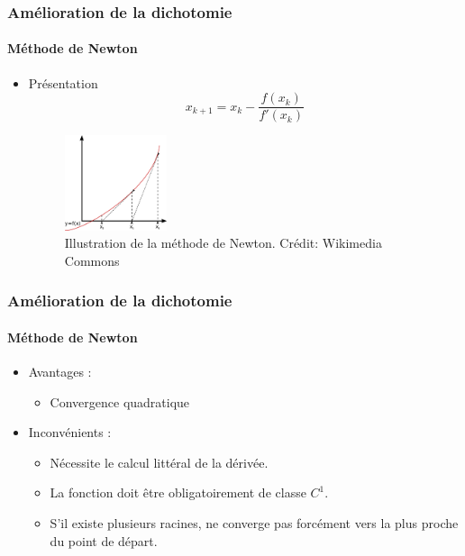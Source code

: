\documentclass[french]{beamer}
\begin{document}

\begin{frame}
\frametitle{Amélioration de la dichotomie}
\framesubtitle{Méthode de Newton}

   \begin{itemize}
      \item Présentation
      \\
      \begin{equation}
         x_{k+1} = x_k - \frac{f(x_k)}{f'(x_k)}
      \end{equation}

      \begin{figure}[htb!]
         \includegraphics[width=3cm]{figures/Newton_method.png}
         \caption{Illustration de la méthode de Newton. Crédit: Wikimedia Commons}
      \end{figure}

   \end{itemize}
\end{frame}


\begin{frame}
\frametitle{Amélioration de la dichotomie}
\framesubtitle{Méthode de Newton}

   \begin{itemize}
      \item Avantages :
         \begin{itemize}
            \item Convergence quadratique
         \end{itemize}
      \item Inconvénients :
      \begin{itemize}
         \item Nécessite le calcul littéral de la dérivée.
         \item La fonction doit être obligatoirement de classe $C^1$.
         \item S'il existe plusieurs racines, ne converge pas forcément vers la plus proche du point de départ.
      \end{itemize}
   \end{itemize}
\end{frame}
\end{document}
